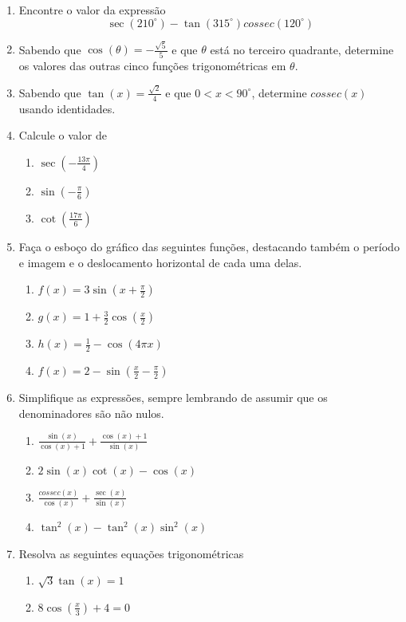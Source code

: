 \begin{enumerate}
    \item Encontre o valor da expressão
    $$\sec(210^{\circ})-\tan(315^{\circ}) cossec(120^{\circ})$$
    \item Sabendo que $\cos(\theta)=- \frac{\sqrt{5}}{5}$ e que $\theta$ está no terceiro quadrante, determine os valores das outras cinco funções trigonométricas em $\theta$.
    \item Sabendo que $\tan(x)= \frac{\sqrt{2}}{4}$ e que $0 <x < 90^{\circ}$, determine $cossec(x)$ usando identidades.
    \item Calcule o valor de 
    \begin{enumerate}
        \item $\sec(-\frac{13\pi}{4})$
        \item $\sin(-\frac{\pi}{6})$
        \item $\cot(\frac{17\pi}{6})$
    \end{enumerate}
    \item Faça o esboço do gráfico das seguintes funções, destacando também o período e imagem e o deslocamento horizontal de cada uma delas.
    \begin{enumerate}
        \item $f(x)=3 \sin(x+ \frac{\pi}{2})$
        \item $g(x)=1+\frac{3}{2}\cos(\frac{x}{2})$
        \item $h(x)=\frac{1}{2}-\cos(4\pi x)$
        \item $f(x)=2-\sin(\frac{x}{2}-\frac{\pi}{2})$
    \end{enumerate}
    \item Simplifique as expressões, sempre lembrando de assumir que os denominadores são não nulos.
    \begin{enumerate}
        \item $\frac{\sin(x)}{\cos(x)+1}+\frac{\cos(x)+1}{\sin(x)}$
        \item $2\sin(x) \cot(x)-\cos(x)$
        \item $\frac{cossec(x)}{\cos(x)}+\frac{\sec(x)}{\sin(x)}$
        \item $\tan^2(x)-\tan^2(x)\sin^2(x)$
    \end{enumerate}
    \item Resolva as seguintes equações trigonométricas
    \begin{enumerate}
        \item $\sqrt{3}\tan(x)=1$
        \item $8 \cos(\frac{x}{3})+4=0$

\end{enumerate}
\end{enumerate}
